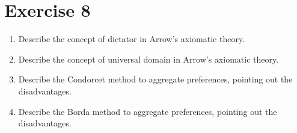 \documentclass[\main/main.tex]{subfiles}
\begin{document}
\section{Exercise 8}
\begin{enumerate}
  \item Describe the concept of dictator in Arrow's axiomatic theory.
  \item Describe the concept of universal domain in Arrow's axiomatic theory.
  \item Describe the Condorcet method to aggregate preferences, pointing out the disadvantages.
  \item Describe the Borda method to aggregate preferences, pointing out the disadvantages.
\end{enumerate}
\end{document}
